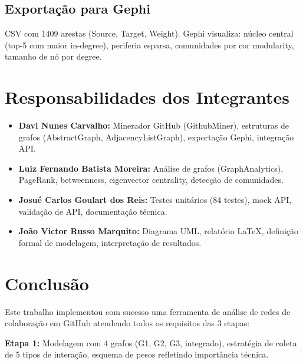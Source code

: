 \documentclass[12pt,a4paper]{article}
\begin{document}
\subsection{Exportação para Gephi}

CSV com 1409 arestas (Source, Target, Weight). Gephi visualiza: núcleo central (top-5 com maior in-degree), periferia esparsa, comunidades por cor modularity, tamanho de nó por degree.

\section{Responsabilidades dos Integrantes}\label{sec:responsabilidades}

\begin{itemize}
  \item \textbf{Davi Nunes Carvalho:} Minerador GitHub (GithubMiner), estruturas de grafos (AbstractGraph, AdjacencyListGraph), exportação Gephi, integração API.
  \item \textbf{Luiz Fernando Batista Moreira:} Análise de grafos (GraphAnalytics), PageRank, betweenness, eigenvector centrality, detecção de comunidades.
  \item \textbf{Josué Carlos Goulart dos Reis:} Testes unitários (84 testes), mock API, validação de API, documentação técnica.
  \item \textbf{João Victor Russo Marquito:} Diagrama UML, relatório LaTeX, definição formal de modelagem, interpretação de resultados.
\end{itemize}

\section{Conclusão}\label{sec:conclusao}

Este trabalho implementou com sucesso uma ferramenta de análise de redes de colaboração em GitHub atendendo todos os requisitos das 3 etapas:

\textbf{Etapa 1:} Modelagem com 4 grafos (G1, G2, G3, integrado), estratégia de coleta de 5 tipos de interação, esquema de pesos refletindo importância técnica.
\end{document}
